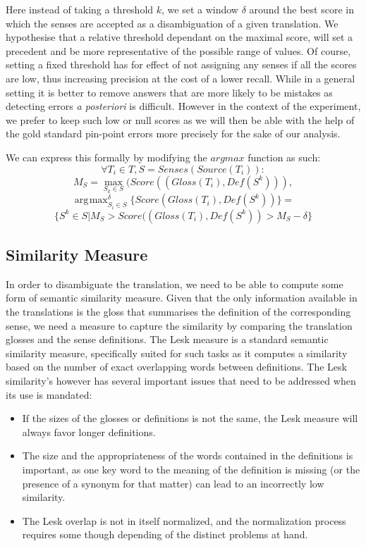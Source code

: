 \documentclass[10pt, a4paper]{article}
\DeclareMathOperator*{\argmax}{arg\!\max}
\begin{document}
Here instead of taking a threshold \(k\), we set a window \(\delta\) around the best score in which the senses are accepted as a disambiguation of a given translation. We hypothesise that a relative threshold dependant on the maximal score, will set a precedent and be more representative of the possible range of values. Of course, setting a fixed threshold has for effect of not assigning any senses if all the scores are low, thus increasing precision at the cost of a lower recall. While in a general setting it is better to remove answers that are more likely to be mistakes as detecting errors \emph{a posteriori} is difficult. However in the context of the experiment, we prefer to keep such low or null scores as we will then be able with the help of the gold standard pin-point errors more precisely for the sake of our analysis.

We can express this formally by modifying the \(argmax\) function as such:
\[
\forall T_i \in T, S=Senses(Source(T_i)): 
\]
\[
M_S = \max_{S_k\in S}(Score((Gloss(T_i),Def(S^k))),
\]
\[
\argmax_{S_i\in S}^\delta \{Score(Gloss(T_i),Def(S^k))\}=
\]
\[
\{S^k\in S|  M_S > Score((Gloss(T_i),Def(S^k)) > M_S-\delta \}
\]

\subsection{Similarity Measure}
In order to disambiguate the translation, we need to be able to compute some form of semantic similarity measure. Given that the only information available in the translations is the gloss that summarises the definition of the corresponding sense, we need a measure to capture the similarity by comparing the translation glosses and the sense definitions. The Lesk \cite{citeulike:625530} measure is a standard semantic similarity measure, specifically suited for such tasks as it computes a similarity based on the number of exact overlapping words between definitions. The Lesk similarity's however has several important issues that need to be addressed when its use is mandated: 
\begin{itemize}
	\item If the sizes of the glosses or definitions is not the same, the Lesk measure will always favor longer definitions.
	\item The size and the appropriateness of the words contained in the definitions is important, as one key word to the meaning of the definition is missing (or the presence of a synonym for that matter) can lead to an incorrectly low similarity.
	\item The Lesk overlap is not in itself normalized, and the normalization process requires some though depending of the distinct problems at hand.
\end{itemize}
 
\end{document}
